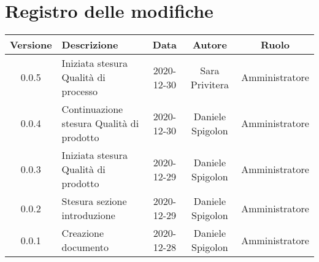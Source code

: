 \section*{Registro delle modifiche}

\begin{center}
	\begin{longtable}{|c|p{5cm}|c|c|c|}
	\hline
	\rowcolor{lighter-grayer}
	\textbf{Versione} & \textbf{Descrizione} & \textbf{Data} & \textbf{Autore} & \textbf{Ruolo} \\
	\hline
	\endfirsthead

	\hline
	0.0.5 & Iniziata stesura Qualità di processo & 2020-12-30 & Sara Privitera & Amministratore \\
	\hline
	0.0.4 & Continuazione stesura Qualità di prodotto & 2020-12-30 & Daniele Spigolon & Amministratore \\
	\hline
	0.0.3 & Iniziata stesura Qualità di prodotto & 2020-12-29 & Daniele Spigolon & Amministratore \\
	\hline
	0.0.2 & Stesura sezione introduzione & 2020-12-29 & Daniele Spigolon & Amministratore \\
	\hline
	0.0.1 & Creazione documento & 2020-12-28 & Daniele Spigolon & Amministratore \\
	\hline

	\end{longtable}
\end{center}